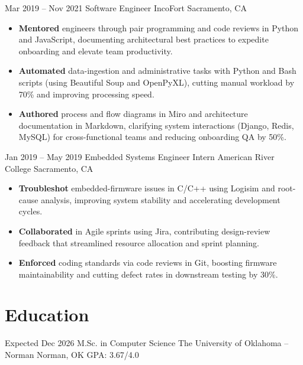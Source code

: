 \documentclass[11pt]{moderncv}
\begin{document}
\cventry
    {Mar 2019 -- Nov 2021}
    {Software Engineer}
    {IncoFort}
    {Sacramento, CA}
    {}
    {%
        \begin{itemize}%
            \item \textbf{Mentored} engineers through pair programming and code
            reviews in Python and JavaScript, documenting architectural best
            practices to expedite onboarding and elevate team productivity.%
            \item \textbf{Automated} data-ingestion and administrative tasks
            with Python and Bash scripts (using Beautiful Soup and OpenPyXL),
            cutting manual workload by 70\% and improving processing speed.%
            \item \textbf{Authored} process and flow diagrams in Miro and
            architecture documentation in Markdown, clarifying system
            interactions (Django, Redis, MySQL) for cross-functional teams and
            reducing onboarding QA by 50\%.
        \end{itemize}%
    }

\cventry
    {Jan 2019 -- May 2019}
    {Embedded Systems Engineer Intern}
    {American River College}
    {Sacramento, CA}
    {}
    {
        \begin{itemize}%
            \item \textbf{Troubleshot} embedded-firmware issues in C/C++ using
            Logisim and root-cause analysis, improving system stability and
            accelerating development cycles.%
            \item \textbf{Collaborated} in Agile sprints using Jira,
            contributing design-review feedback that streamlined resource
            allocation and sprint planning.%
            \item \textbf{Enforced} coding standards via code reviews in Git,
            boosting firmware maintainability and cutting defect rates in
            downstream testing by 30\%.
        \end{itemize}%
    }
\section{Education}

\cventry
    {Expected Dec 2026}
    {M.Sc. in Computer Science}
    {The University of Oklahoma -- Norman}
    {Norman, OK}
    {GPA: 3.67/4.0}
    {}
\end{document}
